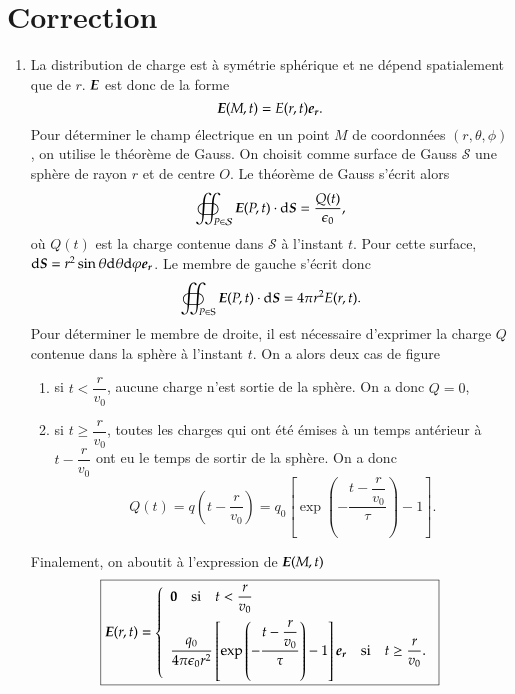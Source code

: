 \section{Correction}

\begin{corrige}
	\begin{enumerate}
		\item La distribution de charge est à symétrie sphérique et 
		  ne dépend spatialement que de $r$. $\vece$ est donc de la forme
		  \begin{equation*}
			  \vece(M, t) = E(r, t)\er.
		  \end{equation*}
		  Pour déterminer le champ électrique en un point $M$ de 
		  coordonnées $(r, \theta, \phi)$, on utilise le théorème de 
		  Gauss. On choisit comme surface de Gauss $\mathcal{S}$ une sphère de 
		  rayon $r$ et de centre $O$. Le théorème de Gauss s'écrit alors
		  \begin{equation*}
			  \oiint_{P \in \mathcal{S}} \vece(P, t) \cdot \ds 
			  = \dfrac{Q(t)}{\epsilon_0},
		  \end{equation*}
		  où $Q(t)$ est la charge contenue dans $\mathcal{S}$ à l'instant
		  $t$. Pour cette surface, $\ds = r^2 \sin \theta \dtheta \dphi \er$.
		  Le membre de gauche s'écrit donc
		  \begin{equation*}
			  \oiint_{P \in \mathrm{S}} \vece(P, t) \cdot \ds =
			  4 \pi r^2 E(r, t).
		  \end{equation*}
		  Pour déterminer le membre de droite, il est nécessaire d'exprimer
		  la charge $Q$ contenue dans la sphère à l'instant $t$. On a
		  alors deux cas de figure
		  \begin{enumerate}
			  \item si $t < \dfrac{r}{v_0}$, aucune charge n'est 
			    sortie de la sphère. On a donc $Q = 0$,
			  \item si $t \ge \dfrac{r}{v_0}$, toutes les charges
		            qui ont été émises à un temps antérieur à $t -
			    \dfrac{r}{v_0}$ ont eu le temps de sortir de la sphère.
			    On a donc
			    \begin{equation*}
				    Q(t) = q\left(t - \dfrac{r}{v_0} \right)
				      = q_0 \left[\exp\left(- \dfrac{t - 
					      \dfrac{r}{v_0}}{\tau}\right) - 1
					   \right].
			   \end{equation*}
		  \end{enumerate}
		  Finalement, on aboutit à l'expression de $\vece(M, t)$
		  \begin{equation*}
			  \boxed{
			  \vece(r, t) =
			  \left\{
			  \begin{array}{l}
				  \vec{0} \quad \mathrm{si} \quad t < 
				  \dfrac{r}{v_0} \\[1em]
				  \dfrac{q_0}{4 \pi \epsilon_0 r^2}
				  \left[\exp\left(- \dfrac{t - 
			          \dfrac{r}{v_0}}{\tau}\right) - 1 \right]\er
				  \quad \mathrm{si} \quad t \ge \dfrac{r}{v_0}.
		         \end{array}
			 \right.
		 }
		\end{equation*}


\end{enumerate}
\end{corrige}
